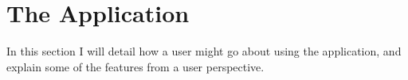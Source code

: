 \section{The Application}

In this section I will detail how a user might go about using the application, and explain some of the features from a user perspective.


